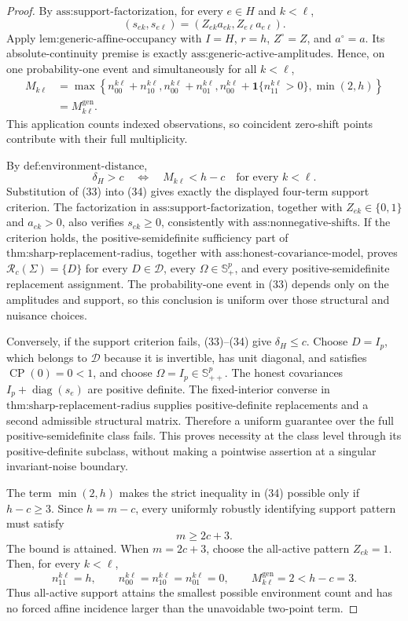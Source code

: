 \documentclass{article}
\begin{document}
\begin{proof}
By \(\text{ass:support-factorization}\), for every \(e\in H\) and \(k<\ell\),
\[
 (s_{ek},s_{e\ell})
 =(Z_{ek}a_{ek},Z_{e\ell}a_{e\ell}).
 \tag{32}
\]
Apply \(\text{lem:generic-affine-occupancy}\) with \(I=H\), \(r=h\), \(Z^\circ=Z\), and \(a^\circ=a\).  Its absolute-continuity premise is exactly \(\text{ass:generic-active-amplitudes}\).  Hence, on one probability-one event and simultaneously for all \(k<\ell\),
\[
 \begin{aligned}
 M_{k\ell}
 &=\max\!\left\{
 n_{00}^{k\ell}+n_{10}^{k\ell},
 n_{00}^{k\ell}+n_{01}^{k\ell},
 n_{00}^{k\ell}+\mathbf 1\{n_{11}^{k\ell}>0\},
 \min(2,h)
 \right\}\\
 &=M_{k\ell}^{\mathrm{gen}}.
 \end{aligned}
 \tag{33}
\]
This application counts indexed observations, so coincident zero-shift points contribute with their full multiplicity.

By \(\text{def:environment-distance}\),
\[
 \delta_H>c
 \quad\Longleftrightarrow\quad
 M_{k\ell}<h-c\quad\text{for every }k<\ell.
 \tag{34}
\]
Substitution of (33) into (34) gives exactly the displayed four-term support criterion.  The factorization in \(\text{ass:support-factorization}\), together with \(Z_{ek}\in\{0,1\}\) and \(a_{ek}>0\), also verifies \(s_{ek}\ge0\), consistently with \(\text{ass:nonnegative-shifts}\).  If the criterion holds, the positive-semidefinite sufficiency part of \(\text{thm:sharp-replacement-radius}\), together with \(\text{ass:honest-covariance-model}\), proves \(\mathcal R_c(\Sigma)=\{D\}\) for every \(D\in\mathcal D\), every \(\Omega\in\mathbb S_+^p\), and every positive-semidefinite replacement assignment.  The probability-one event in (33) depends only on the amplitudes and support, so this conclusion is uniform over those structural and nuisance choices.

Conversely, if the support criterion fails, (33)--(34) give \(\delta_H\le c\).  Choose \(D=I_p\), which belongs to \(\mathcal D\) because it is invertible, has unit diagonal, and satisfies \(\operatorname{CP}(0)=0<1\), and choose \(\Omega=I_p\in\mathbb S_{++}^p\).  The honest covariances \(I_p+\operatorname{diag}(s_e)\) are positive definite.  The fixed-interior converse in \(\text{thm:sharp-replacement-radius}\) supplies positive-definite replacements and a second admissible structural matrix.  Therefore a uniform guarantee over the full positive-semidefinite class fails.  This proves necessity at the class level through its positive-definite subclass, without making a pointwise assertion at a singular invariant-noise boundary.

The term \(\min(2,h)\) makes the strict inequality in (34) possible only if \(h-c\ge3\).  Since \(h=m-c\), every uniformly robustly identifying support pattern must satisfy
\[
 m\ge2c+3.
 \tag{35}
\]
The bound is attained.  When \(m=2c+3\), choose the all-active pattern \(Z_{ek}=1\).  Then, for every \(k<\ell\),
\[
 n_{11}^{k\ell}=h,
 \qquad
 n_{00}^{k\ell}=n_{10}^{k\ell}=n_{01}^{k\ell}=0,
 \qquad
 M_{k\ell}^{\mathrm{gen}}=2<h-c=3.
 \tag{36}
\]
Thus all-active support attains the smallest possible environment count and has no forced affine incidence larger than the unavoidable two-point term.
\end{proof}
\end{document}
